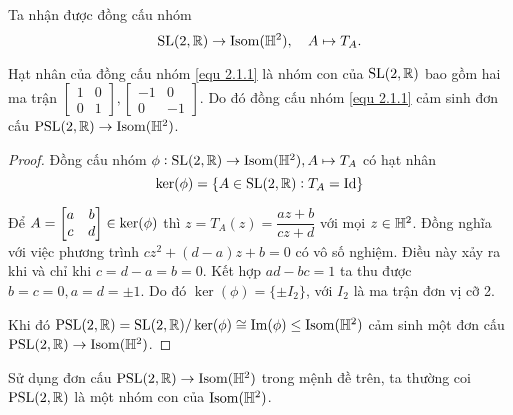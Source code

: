 Ta nhận được đồng cấu nhóm 
\begin{equation}\label{equ 2.1.1}
\operatorname{SL}(2,\mathbb{R}) \to \operatorname{Isom}(\mathbb{H}^2),\quad A \mapsto T_A.
\end{equation}
\begin{prop}\label{prop 2.1.13}
    Hạt nhân của đồng cấu nhóm \ref{equ 2.1.1} là nhóm con của $\operatorname{SL}(2,\mathbb{R})$ bao gồm hai ma trận $\begin{bmatrix}
        1 & 0\\
        0 & 1
    \end{bmatrix}, \begin{bmatrix}
        -1 & 0\\
        0 & -1
    \end{bmatrix}$. Do đó đồng cấu nhóm \ref{equ 2.1.1} cảm sinh đơn cấu $\operatorname{PSL}(2,\mathbb{R}) \to \operatorname{Isom}(\mathbb{H}^2)$. 
\end{prop}
\begin{proof}
    Đồng cấu nhóm $\phi: \operatorname{SL}(2,\mathbb{R}) \to \operatorname{Isom}(\mathbb{H}^2),A \mapsto T_A$ có hạt nhân \[\ker(\phi) = \{A \in \operatorname{SL}(2,\mathbb{R}): T_A = \operatorname{Id}\}\]

    Để $A  = \begin{bmatrix} a & b \\ c & d \\ \end{bmatrix} \in \ker(\phi)$ thì $z = T_A(z) = \dfrac{az+b}{cz+d}$  với mọi $z\in \mathbb{H}^2$.
    Đồng nghĩa với việc phương trình $cz^2+(d-a)z+b = 0$ có vô số nghiệm. Điều này xảy ra khi và chỉ khi $c=d-a=b=0$. Kết hợp $ad-bc=1$ ta thu được $b=c=0, a=d=\pm 1$. Do đó $\ker(\phi)= \{\pm I_2\}$, với $I_2$ là ma trận đơn vị cỡ 2.

    Khi đó $\operatorname{PSL}(2,\mathbb{R}) = \operatorname{SL}(2,\mathbb{R})/\ker(\phi) \cong \operatorname{Im}(\phi) \leq \operatorname{Isom}(\mathbb{H}^2)$ cảm sinh một đơn cấu $\operatorname{PSL}(2,\mathbb{R}) \to \operatorname{Isom}(\mathbb{H}^2)$.
\end{proof}
Sử dụng đơn cấu $\operatorname{PSL}(2,\mathbb{R}) \to \operatorname{Isom}(\mathbb{H}^2)$ trong mệnh đề trên, ta thường coi $\operatorname{PSL}(2,\mathbb{R})$ là một nhóm con của $\operatorname{Isom}(\mathbb{H}^2)$.



